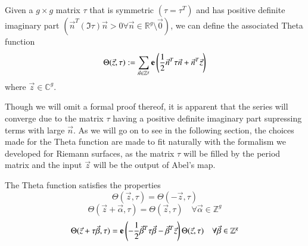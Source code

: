 \begin{definition}
    Given a $g \times g$ matrix $\tau$ that is symmetric $(\tau = \tau^T)$ and has positive definite imaginary part $(\vec n^T (\Im \tau) \vec n > 0 \forall \vec n \in \mathbb R^g \setminus \vec 0)$, we can define the associated Theta function
    \begin{equation} \label{eqnB12:ThetaGeneralDefn}
        \Theta(\vec z,\tau) := \sum_{\vec n \in \mathbb Z^g} \mathbf{e}\left(\frac{1}{2} \vec n^T \tau \vec n + \vec n^T \vec z\right)
    \end{equation}
    where $\vec z \in \mathbb C^g$.
\end{definition}

Though we will omit a formal proof thereof, it is apparent that the series will converge due to the matrix $\tau$ having a positive definite imaginary part supressing terms with large $\vec n$. As we will go on to see in the following section, the choices made for the Theta function are made to fit naturally with the formalism we developed for Riemann surfaces, as the matrix $\tau$ will be filled by the period matrix and the input $\vec z$ will be the output of Abel's map.

\begin{lemma}
    \label{lemmaB12:ThetaGeneralProperties}
    The Theta function satisfies the properties
    \begin{equation} \label{eqnB12:ThetaGeneralEven}
        \Theta(\vec z,\tau) = \Theta(-\vec z,\tau)
    \end{equation}
    \begin{equation} \label{eqnB12:ThetaGeneralShift}
        \Theta(\vec z+\vec \alpha,\tau) = \Theta(\vec z,\tau) \quad \forall \vec \alpha \in \mathbb Z^g
    \end{equation}
    \begin{equation} \label{eqnB12:ThetaGeneralTauShift}
        \Theta(\vec z + \tau \vec \beta, \tau) = \mathbf{e}\left(-\frac{1}{2}\vec \beta^T \tau \vec \beta - \vec \beta^T \vec z\right) \Theta(\vec z, \tau) \quad \forall \vec \beta \in \mathbb Z^g
    \end{equation}
\end{lemma}

